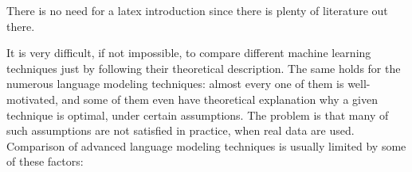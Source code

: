 There is no need for a latex introduction since there is plenty of literature out there.


It is very difficult, if not impossible, to compare different machine learning techniques just by following their theoretical description. The same holds for the numerous language modeling techniques: almost every one of them is well-motivated, and some of them even have theoretical explanation why a given technique is optimal, under certain assumptions. The problem is that many of such assumptions are not satisfied in practice, when real data are used.
Comparison of advanced language modeling techniques is usually limited by some of these factors:

